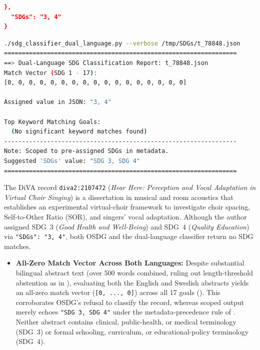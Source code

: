 \begin{casestudySection}
\begin{lstlisting}[language={json}, inputencoding=utf8, caption={t\_78848.json (manually reformatted to keep only one abstract per language and added newlines after the end of paragraphs)}, label=lst:t_78848.json]
  },
  "SDGs": "3, 4"
}
\end{lstlisting}

\begin{lstlisting}[language={bash}, basicstyle=\footnotesize, escapechar=|, breaklines=true,
    postbreak=\usebox{\lstbreakbox}, caption={Program's output}, label=lst:t_78848Output]
./sdg_classifier_dual_language.py --verbose /tmp/SDGs/t_78848.json
=================================================================
==> Dual-Language SDG Classification Report: t_78848.json
Match Vector (SDG 1 - 17):
[0, 0, 0, 0, 0, 0, 0, 0, 0, 0, 0, 0, 0, 0, 0, 0, 0]

Assigned value in JSON: "3, 4"

Top Keyword Matching Goals:
  (No significant keyword matches found)
-----------------------------------------------------------------
Note: Scoped to pre-assigned SDGs in metadata.
Suggested 'SDGs' value: "SDG 3, SDG 4"
=================================================================
\end{lstlisting}

The \gls{DiVA} record \texttt{diva2:2107472} (\textit{Hear Here: Perception and Vocal Adaptation in Virtual Choir Singing}) is a dissertation in musical and room acoustics that establishes an experimental virtual-choir framework to investigate choir spacing, Self-to-Other Ratio (SOR), and singers' vocal adaptation. Although the author assigned \gls{SDG}~3 (\emph{Good Health and Well-Being}) and \gls{SDG}~4 (\emph{Quality Education}) via \texttt{"SDGs": "3, 4"}, both OSDG and the dual-language classifier return no \gls{SDG} matches.

\begin{itemize}
    \item \textbf{All-Zero Match Vector Across Both Languages:} Despite substantial bilingual abstract text (over \num{500} words combined, ruling out length-threshold abstention as in ), evaluating both the English and Swedish abstracts yields an all-zero match vector (\texttt{[0, ..., 0]}) across all \num{17} goals (). This corroborates OSDG's refusal to classify the record, whereas scoped output merely echoes \texttt{"SDG 3, SDG 4"} under the metadata-precedence rule of . Neither abstract contains clinical, public-health, or medical terminology (\gls{SDG}~3) or formal schooling, curriculum, or educational-policy terminology (\gls{SDG}~4).
  

\end{itemize}
\end{casestudySection}
